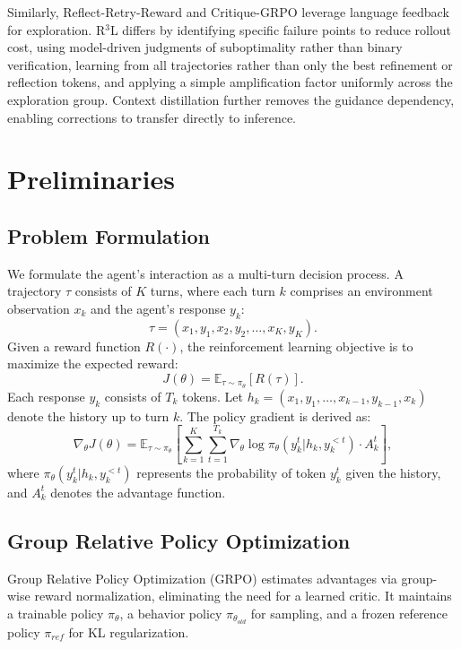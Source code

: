 \documentclass[11pt]{article}
\theoremstyle{definition}
\theoremstyle{remark}
\begin{document}
Similarly, Reflect-Retry-Reward \cite{bensal2025reflect} and Critique-GRPO \cite{zhang2025critique} leverage language feedback for exploration. R$^3$L differs by identifying specific failure points to reduce rollout cost, using model-driven judgments of suboptimality rather than binary verification, learning from all trajectories rather than only the best refinement or reflection tokens, and applying a simple amplification factor uniformly across the exploration group. Context distillation further removes the guidance dependency, enabling corrections to transfer directly to inference.

\section{Preliminaries}
\subsection{Problem Formulation}
We formulate the agent's interaction as a multi-turn decision process. A trajectory $\tau$ consists of $K$ turns, where each turn $k$ comprises an environment observation $x_k$ and the agent's response $y_k$:
\begin{equation}
    \tau = (x_1, y_1, x_2, y_2, \ldots, x_K, y_K).
\end{equation}
Given a reward function $R(\cdot)$, the reinforcement learning objective is to maximize the expected reward:
\begin{equation}
    J(\theta) = \mathbb{E}_{\tau \sim \pi_{\theta}} [R(\tau)].
\end{equation}
Each response $y_k$ consists of $T_k$ tokens. Let $h_k = (x_1, y_1, \ldots, x_{k-1}, y_{k-1}, x_k)$ denote the history up to turn $k$. The policy gradient is derived as:
\begin{equation}
    \nabla_{\theta} J(\theta) \!\!=\!\! \mathbb{E}_{\tau \sim \pi_{\theta}} \!\!\left[ \sum_{k=1}^{K} \!\! \sum_{t=1}^{T_k} \!\! \nabla_{\theta} \! \log \pi_{\theta}(y_k^t | h_k, y_k^{<t}) \!\cdot\! A_k^t \! \right]\!,
\end{equation}
where $\pi_{\theta}(y_k^t | h_k, y_k^{<t})$ represents the probability of token $y_k^t$ given the history, and $A_k^t$ denotes the advantage function.

\subsection{Group Relative Policy Optimization}
Group Relative Policy Optimization (GRPO) \cite{shao2024deepseekmath} estimates advantages via group-wise reward normalization, eliminating the need for a learned critic. It maintains a trainable policy $\pi_{\theta}$, a behavior policy $\pi_{\theta_{old}}$ for sampling, and a frozen reference policy $\pi_{ref}$ for KL regularization.
\end{document}
